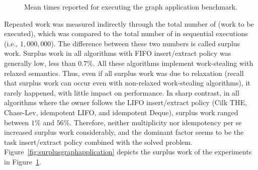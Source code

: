 \begin{figure}[!ht]

  \caption{\label{fig:graphapplication} Mean times reported for executing the graph application benchmark.}
\end{figure}


Repeated work was measured indirectly through the total number of \Puts (work to be executed), which was compared to the total number of \Puts in sequential executions (i.e., $1,000,000$). The difference between these two numbers is called surplus work. Surplus work in all algorithms with FIFO insert/extract policy was generally low, less than $0.7\%$. All these algorithms implement work-stealing with relaxed semantics. Thus, even if all surplus work was due to relaxation (recall that surplus work can occur even with non-relaxed work-stealing algorithms), it rarely happened, with little impact on performance. In sharp contrast, in all algorithms where the owner follows the LIFO insert/extract policy (Cilk THE, Chase-Lev, idempotent LIFO, and idempotent Deque), surplus work ranged between \(1\%\) and \(56\%\). Therefore, neither multiplicity nor idempotency per se increased surplus work considerably, and the dominant factor seems to be the task insert/extract policy combined with the solved problem. Figure~\ref{fig:surplusgraphapplication} depicts the surplus work of the experiments in Figure~\ref{fig:graphapplication}.

